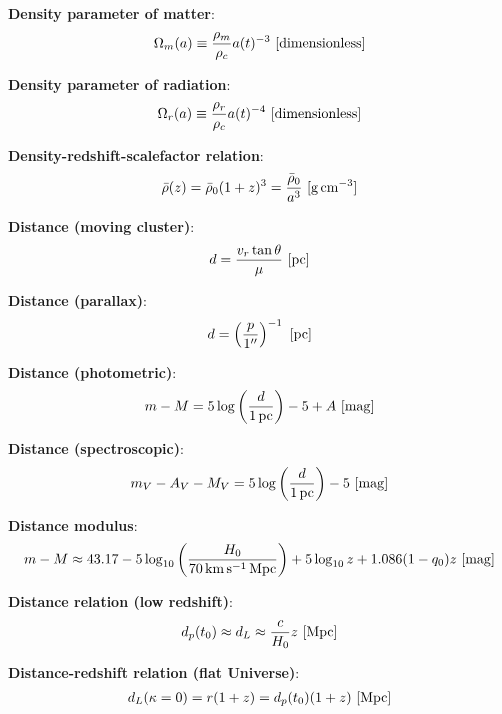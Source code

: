 \documentclass[a4paper,11pt]{article}
\begin{document}
{\noindent}\textbf{Density parameter of matter}:
\begin{align*}
    \Omega_m(a) \equiv \dfrac{\rho_m}{\rho_c}a(t)^{-3} ~ [{\rm dimensionless}]
\end{align*}

{\noindent}\textbf{Density parameter of radiation}:
\begin{align*}
    \Omega_r(a) \equiv \dfrac{\rho_r}{\rho_c}a(t)^{-4} ~ [{\rm dimensionless}]
\end{align*}

{\noindent}\textbf{Density-redshift-scalefactor relation}:
\begin{align*}
    \bar{\rho}(z) = \bar{\rho}_0(1+z)^3 = \frac{\bar{\rho}_0}{a^3} ~ [{\rm g\,cm^{-3}}]
\end{align*}

{\noindent}\textbf{Distance (moving cluster)}:
\begin{align*}
    d = \frac{v_r\tan\theta}{\mu} ~ [{\rm pc}]
\end{align*}

{\noindent}\textbf{Distance (parallax)}:
\begin{align*}
    d = \left(\frac{p}{1''}\right)^{-1} ~ {[\rm pc]}
\end{align*}

{\noindent}\textbf{Distance (photometric)}:
\begin{align*}
    m-M = 5\log\left(\frac{d}{1\,{\rm pc}}\right)-5+A ~ [{\rm mag}]
\end{align*}

{\noindent}\textbf{Distance (spectroscopic)}:
\begin{align*}
    m_V-A_V-M_V = 5\log\left(\frac{d}{1\,{\rm pc}}\right)-5 ~ [{\rm mag}]
\end{align*}

{\noindent}\textbf{Distance modulus}:
\begin{align*}
    m - M \approx 43.17 - 5\log_{10} \left(\frac{H_0}{70\,{\rm km\,s^{-1}\,Mpc}}\right) + 5\log_{10}z + 1.086(1-q_0)z ~ [{\rm mag}]
\end{align*}

{\noindent}\textbf{Distance relation (low redshift)}:
\begin{align*}
    d_p(t_0) \approx d_L \approx \frac{c}{H_0}z ~ [{\rm Mpc}]
\end{align*}

{\noindent}\textbf{Distance-redshift relation (flat Universe)}:
\begin{align*}
    d_L(\kappa=0) = r(1+z) = d_p(t_0)(1+z) ~ [{\rm Mpc}]
\end{align*}
\end{document}
